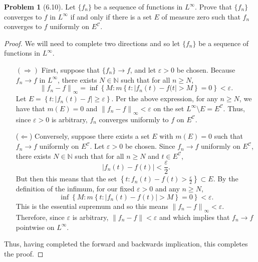 \documentclass[12pt]{article}
\newcommand{\N}{\mathbb{N}}
\newcommand{\C}{\mathscr{C}}
\renewcommand{\epsilon}{\varepsilon}
\newcommand{\norm}[1]{\left\lVert #1 \right\rVert}
\theoremstyle{definition}
\newtheorem{problem}{Problem}
\begin{document}
\begin{problem}[6.10]
    Let \( \{f_n\} \) be a sequence of functions in \( L^{\infty} \). Prove that \( \{f_n\} \) converges to \( f \) in \( L^{\infty} \) 
    if and only if there is a set \( E \) of measure zero such that \( f_n \) converges to \( f \) uniformly on \( E^{\C} \).

        \begin{proof}
            We will need to complete two directions and so let \( \{f_n\} \) be a sequence of functions in \( L^{\infty} \).  
                \begin{enumerate}
                    \item[\((\Rightarrow)\)] First, suppose that \( \{f_n\} \to f \), and let \( \epsilon > 0 \) be chosen. Because \( f_n \to f \) in \( L^{\infty} \), there exists \( N \in \N \) such that for all \( n \geq N \),
                        \[
                            \norm{f_n - f}_{\infty} = \inf \left\{ M: m\left\{ t : |f_n(t) - f(t| > M \right\} = 0 \right\} < \epsilon.  
                        \]
                    Let \( \displaystyle E = \left\{ t: |f_n(t) - f| \geq \epsilon \right\} \).
                    Per the above expression, for any \( n \geq N \), we have that \( m(E) = 0 \) and \( \norm{f_n - f }_{\infty} < \epsilon \) on the set \( L^{\infty} \setminus E = E^{\C} \). Thus, since \( \epsilon > 0 \) is arbitrary, \( f_n \) converges uniformly to \( f \) on \( E^{\C} \).
                    \item[(\(\Leftarrow\))] 
                    Conversely, suppose there exists a set \( E \) with \( m(E) = 0 \) such that \( f_n \to f \) uniformly on \( E^{\C} \). 
                    Let \( \epsilon > 0 \) be chosen. Since \( f_n \to f \) uniformly on \( E^{\C}\), there exists \( N \in \N \) such that for all \( n \geq N \) and \( t \in E^{\C}\),
                        \[
                             |f_n(t) - f(t)| < \frac{\epsilon}{2}.
                        \]
                    But then this means that the set \( \displaystyle \left\{t: f_n(t) - f(t) > \frac{\epsilon}{2}  \right\} \subset E \). By the definition of the infimum, for our fixed \( \epsilon > 0 \) and any \( n \geq N \), \[ \inf \left\{ M : m \left\{ t : |f_n(t) - f(t)| > M \right\}  = 0 \right\} < \epsilon. \]
                    This is the essential supremum and so this means \( \norm{f_n - f}_{\infty} < \epsilon \). 
                    Therefore, since \( \epsilon \) is arbitrary, \( \norm{f_n - f} < \epsilon \) and which implies that \( f_n \to f \) pointwise on \( L^{\infty} \).
                \end{enumerate}
            Thus, having completed the forward and backwards implication, this completes the proof.
        \end{proof}

\end{problem}
\end{document}
